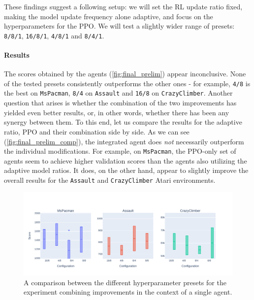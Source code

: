 \documentclass[en]{pracamgr}
\newcommand{\env}[1]{{\tt #1}}
\newcommand{\figurewidth}{\linewidth}
\newcommand{\figureheight}{0.8\paperheight}
\begin{document}
These findings suggest a following setup: we will set the RL update ratio fixed, making the model update frequency alone adaptive, and focus on the hyperparameters for the PPO. We will test a slightly wider range of presets: {\tt 8/8/1}, {\tt 16/8/1}, {\tt 4/8/1} and {\tt 8/4/1}.

\paragraph{Results} The scores obtained by the agents (\autoref{fig:final_prelim}) appear inconclusive. None of the tested presets consistently outperforms the other ones - for example, {\tt 4/8} is the best on \env{MsPacman}, {\tt 8/4} on \env{Assault} and {\tt 16/8} on \env{CrazyClimber}. Another question that arises is whether the combination of the two improvements has yielded even better results, or, in other words, whether there has been any synergy between them. To this end, let us compare the results for the adaptive ratio, PPO and their combination side by side. As we can see (\autoref{fig:final_prelim_comp}), the integrated agent does \emph{not} necessarily outperform the individual modifications. For example, on \env{MsPacman}, the PPO-only set of agents seem to achieve higher validation scores than the agents also utilizing the adaptive model ratios. It does, on the other hand, appear to slightly improve the overall results for the \env{Assault} and \env{CrazyClimber} Atari environments.

\begin{figure}
  \centering
  \includegraphics[width=\figurewidth,height=\figureheight,keepaspectratio]{assets/final_prelim.pdf}
  \caption{A comparison between the different hyperparameter presets for the experiment combining improvements in the context of a single agent.}
  \label{fig:final_prelim}
\end{figure}
\end{document}
